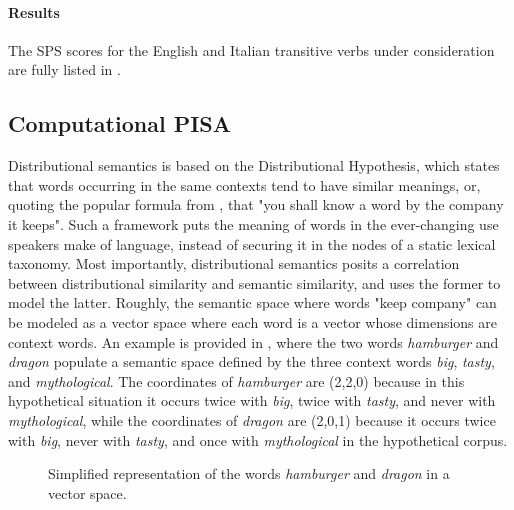 \paragraph{Results}
The SPS scores for the English and Italian transitive verbs under consideration are fully listed in . %


\subsection{Computational PISA} 

Distributional semantics is based on the Distributional Hypothesis, which states that words occurring in the same contexts tend to have similar meanings, or, quoting the popular formula from \textcite{firth1957synopsis}, that "you shall know a word by the company it keeps". Such a framework puts the meaning of words in the ever-changing use speakers make of language, instead of securing it in the nodes of a static lexical taxonomy. Most importantly, distributional semantics posits a correlation between distributional similarity and semantic similarity, and uses the former to model the latter. Roughly, the semantic space where words "keep company" can be modeled as a vector space where each word is a vector whose dimensions are context words. An example is provided in , where the two words \textit{hamburger} and \textit{dragon} populate a semantic space defined by the three context words \textit{big}, \textit{tasty}, and \textit{mythological}. The coordinates of \textit{hamburger} are (2,2,0) because in this hypothetical situation it occurs twice with \textit{big}, twice with \textit{tasty}, and never with \textit{mythological}, while the coordinates of \textit{dragon} are (2,0,1) because it occurs twice with \textit{big}, never with \textit{tasty}, and once with \textit{mythological} in the hypothetical corpus.

\begin{figure}[htb]
\caption{Simplified representation of the words \textit{hamburger} and \textit{dragon} in a vector space.}
\centering
{}
\end{figure}

